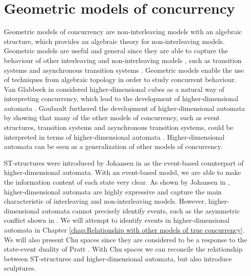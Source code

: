    \section{Geometric models of concurrency}
        Geometric models of concurrency are non-interleaving models with an algebraic structure, which provides an algebraic theory for non-interleaving models. Geometric models are useful and general since they are able to capture the behaviour of other interleaving and non-interleaving models \cite{Goubault18RelationshipsModelsForConcurrency}, such as transition systems and asynchronous transition systems \cite{Fajstrup16DirectedAlgebraicTopologyConcurrency}. Geometric models enable the use of techniques from algebraic topology in order to study concurrent behaviour. Van Glabbeek in \cite{Glabbeek06HDA} considered higher-dimensional cubes as a natural way of interpreting concurrency, which lead to the development of higher-dimensional automata \cite{Glabbeek06HDA, Goubault95PhDThesis, pratt91hda}. Goubault furthered the development of higher-dimensional automata by showing that many of the other models of concurrency, such as event structures, transition systems and asynchronous transition systems, could be interpreted in terms of higher-dimensional automata \cite{Goubault95PhDThesis, Goubault18RelationshipsModelsForConcurrency}. Higher-dimensional automata can be seen as a generalization of other models of concurrency.
        
        ST-structures were introduced by Johansen in \cite{Johansen16STstruct} as the event-based counterpart of higher-dimensional automata. With an event-based model, we are able to make the information content of each state very clear. As shown by Johansen in \cite{Johansen16STstruct}, higher-dimensional automata are highly expressive and capture the main characteristic of interleaving and non-interleaving models. However, higher-dimensional automata cannot precisely identify events, such as the asymmetric conflict shown in \cite[Figure 5]{Johansen16STstruct}. We will attempt to identify events in higher-dimensional automata in Chapter \ref{chap:Relationship with other models of true concurrency}. We will also present Chu spaces since they are considered to be a response to the state-event duality of Pratt \cite{Pratt02eventStateDuality}. With Chu spaces we can reconcile the relationship between ST-structures and higher-dimensional automata, but also introduce sculptures.
        
